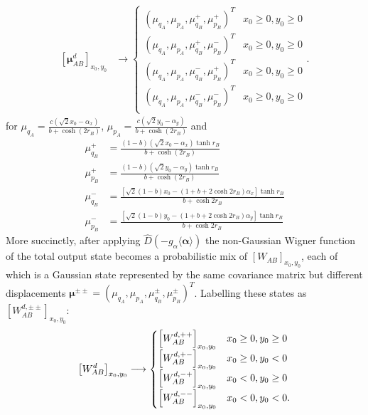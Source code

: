\documentclass[%
 reprint,
 superscriptaddress,
 amsmath,
 amssymb,
 aps,
 pra,
]{revtex4-2}
\begin{document}
\begin{widetext}
\begin{align}
    \left[ \bm{\mu}_{AB}^d \right]_{x_0,y_0} &\longrightarrow
    \begin{cases}
        (\mu_{q_A}, \mu_{p_A}, \mu_{q_B}^+, \mu_{p_B}^+)^T & x_0 \geq 0, y_0 \geq 0 \\
        (\mu_{q_A}, \mu_{p_A}, \mu_{q_B}^+, \mu_{p_B}^-)^T & x_0 \geq 0, y_0 \geq 0 \\
        (\mu_{q_A}, \mu_{p_A}, \mu_{q_B}^-, \mu_{p_B}^+)^T & x_0 \geq 0, y_0 \geq 0 \\
        (\mu_{q_A}, \mu_{p_A}, \mu_{q_B}^-, \mu_{p_B}^-)^T & x_0 \geq 0, y_0 \geq 0 \\
    \end{cases}.
\end{align}
for $\mu_{q_A} = \frac{c(\sqrt{2}x_0-\alpha_x)}{b+\cosh(2r_B)}$, $\mu_{p_A} = \frac{c(\sqrt{2}y_0-\alpha_y)}{b+\cosh(2r_B)}$ and
\begin{align}
    \mu_{q_B}^+ &= \frac{(1-b)(\sqrt{2}x_0-\alpha_x)\tanh r_B}{b+\cosh(2r_B)} \\
    \mu_{p_B}^+ &= \frac{(1-b)(\sqrt{2}y_0-\alpha_y)\tanh r_B}{b+\cosh(2r_B)} \\
    \mu_{q_B}^- &= \frac{[\sqrt{2}(1-b)x_0 - (1 + b + 2 \cosh 2r_B)\alpha_x] \tanh r_B}{b + \cosh 2r_B} \\
    \mu_{p_B}^- &= \frac{[\sqrt{2}(1-b)y_0 - (1 + b + 2 \cosh 2r_B)\alpha_y] \tanh r_B}{b + \cosh 2r_B}
\end{align}
More succinctly, after applying $\hat D(-g_\alpha\langle \bm \alpha \rangle)$ the non-Gaussian Wigner function of the total output state becomes a probabilistic mix of $\left[ W_{AB} \right]_{x_0,y_0}$, each of which is a Gaussian state represented by the same covariance matrix but different displacements $\bm{\mu}^{\pm\pm} = (\mu_{q_A}, \mu_{p_A}, \mu_{q_B}^\pm, \mu_{p_B}^\pm)^T$. Labelling these states as $\left[ W_{AB}^{d,\pm \pm} \right]_{x_0,y_0}$:
\begin{align}
    \left[ W_{AB}^d \right]_{x_0,y_0} \longrightarrow \begin{cases}
        \left[ W_{AB}^{d,++} \right]_{x_0,y_0} & x_0 \geq 0, y_0 \geq 0 \vspace{0.0cm} \\
        \left[ W_{AB}^{d,+-} \right]_{x_0,y_0} & x_0 \geq 0, y_0 < 0 \vspace{0.0cm} \\
        \left[ W_{AB}^{d,-+} \right]_{x_0,y_0} & x_0 < 0, y_0 \geq 0 \vspace{0.0cm} \\
        \left[ W_{AB}^{d,--} \right]_{x_0,y_0} & x_0 < 0, y_0 < 0.

\end{cases}
\end{align}
\end{widetext}
\end{document}
